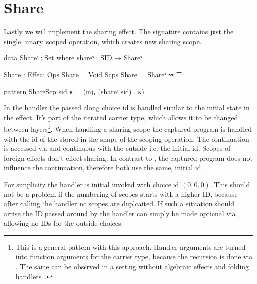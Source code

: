\section{Share}

Lastly we will implement the sharing effect.
The signature contains just the single, unary, scoped operation, 
which creates new sharing scope.

\begin{code}
data Shareˢ : Set where shareˢ : SID → Shareˢ

Share : Effect
Ops   Share = Void
Scps  Share = Shareˢ ↝ ⊤

pattern ShareScp sid κ = (inj₁ (shareˢ sid) , κ)
\end{code}
In the handler the passed along choice id is handled similar to the initial state
in the  effect.
It's part of the iterated carrier type, which allows it to be changed between
layers\footnote{This is a general pattern with this approach. Handler arguments
are turned into function arguments for the carrier type, because the recursion
is done via . The same can be observed in a setting without
algebraic effects and folding handlers~\cite{DBLP:conf/haskell/SchrijversPWJ19}.
}.
When handling a sharing scope the captured program is handled with the id of the
stored in the shape of the scoping operation.
The continuation is accessed via \AgdaFunction{>>=} and continuous with the
outside i.e. the initial id.
Scopes of foreign effects don't effect sharing.
In contrast to , the captured program does not influence the
continuation, therefore both use the same, initial id.

For simplicity the handler is initial invoked with choice id $(0,0,0)$.
This should not be a problem if the numbering of scopes starts with a higher ID,
because after calling the  handler no scopes are duplcaited.
If such a situation should arrise the ID passed around by the handler can simply
be made optional via , allowing no IDs for the outside
choices.

